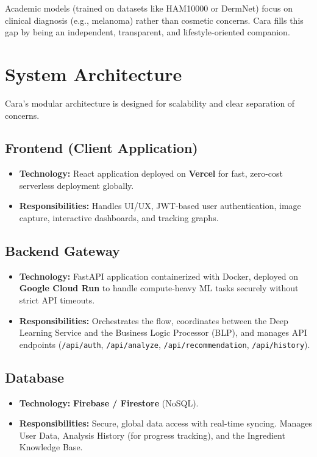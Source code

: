 \documentclass[12pt,a4paper]{article}
\begin{document}
Academic models (trained on datasets like HAM10000 or DermNet) focus on clinical diagnosis (e.g., melanoma) rather than cosmetic concerns. Cara fills this gap by being an independent, transparent, and lifestyle-oriented companion.

\section{System Architecture}
Cara's modular architecture is designed for scalability and clear separation of concerns.

\subsection{Frontend (Client Application)}
\begin{itemize}
    \item \textbf{Technology:} React application deployed on \textbf{Vercel} for fast, zero-cost serverless deployment globally.
    \item \textbf{Responsibilities:} Handles UI/UX, JWT-based user authentication, image capture, interactive dashboards, and tracking graphs.
\end{itemize}

\subsection{Backend Gateway}
\begin{itemize}
    \item \textbf{Technology:} FastAPI application containerized with Docker, deployed on \textbf{Google Cloud Run} to handle compute-heavy ML tasks securely without strict API timeouts.
    \item \textbf{Responsibilities:} Orchestrates the flow, coordinates between the Deep Learning Service and the Business Logic Processor (BLP), and manages API endpoints (\texttt{/api/auth}, \texttt{/api/analyze}, \texttt{/api/recommendation}, \texttt{/api/history}).
\end{itemize}

\subsection{Database}
\begin{itemize}
    \item \textbf{Technology:} \textbf{Firebase / Firestore} (NoSQL).
    \item \textbf{Responsibilities:} Secure, global data access with real-time syncing. Manages User Data, Analysis History (for progress tracking), and the Ingredient Knowledge Base.
\end{itemize}
\end{document}
